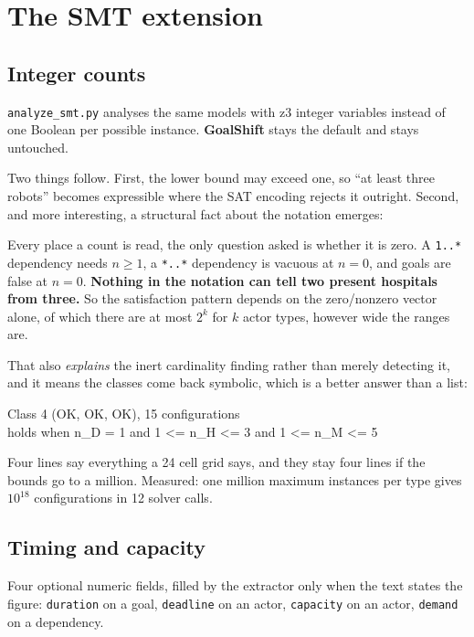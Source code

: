 \documentclass[11pt,a4paper]{article}
\newcommand{\gs}{\textbf{GoalShift}}
\begin{document}
\section{The SMT extension}

\subsection{Integer counts}

\texttt{analyze\_smt.py} analyses the same models with z3 integer variables instead of
one Boolean per possible instance. \gs{} stays the default and stays untouched.

Two things follow. First, the lower bound may exceed one, so ``at least three robots''
becomes expressible where the SAT encoding rejects it outright. Second, and more
interesting, a structural fact about the notation emerges:

\begin{keybox}
Every place a count is read, the only question asked is whether it is zero.
A \texttt{1..*} dependency needs $n \geq 1$, a \texttt{*..*} dependency is vacuous at
$n = 0$, and goals are false at $n = 0$. \textbf{Nothing in the notation can tell two
present hospitals from three.} So the satisfaction pattern depends on the zero/nonzero
vector alone, of which there are at most $2^k$ for $k$ actor types, however wide the
ranges are.
\end{keybox}

That also \emph{explains} the inert cardinality finding rather than merely detecting it,
and it means the classes come back symbolic, which is a better answer than a list:

\begin{center}\ttfamily\small
Class 4 (OK, OK, OK), 15 configurations\\
holds when n\_D = 1 and 1 <= n\_H <= 3 and 1 <= n\_M <= 5
\end{center}

Four lines say everything a 24 cell grid says, and they stay four lines if the bounds go
to a million. Measured: one million maximum instances per type gives $10^{18}$
configurations in 12 solver calls.

\subsection{Timing and capacity}

Four optional numeric fields, filled by the extractor only when the text states the
figure: \texttt{duration} on a goal, \texttt{deadline} on an actor, \texttt{capacity} on
an actor, \texttt{demand} on a dependency.
\end{document}
